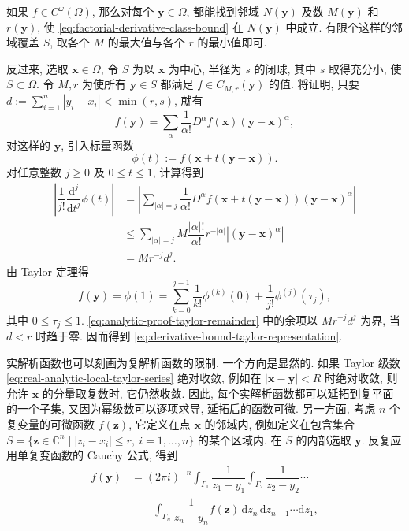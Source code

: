 \begin{Proof}
如果 $f\in C^\omega(\Omega)$, 那么对每个 $\bm{y}\in\Omega$, 都能找到邻域 $N(\bm{y})$ 及数 $M(\bm{y})$ 和 $r(\bm{y})$, 使 \eqref{eq:factorial-derivative-class-bound} 在 $N(\bm{y})$ 中成立. 有限个这样的邻域覆盖 $S$, 取各个 $M$ 的最大值与各个 $r$ 的最小值即可.

反过来, 选取 $\bm{x}\in\Omega$, 令 $S$ 为以 $\bm{x}$ 为中心, 半径为 $s$ 的闭球, 其中 $s$ 取得充分小, 使 $S\subset\Omega$. 令 $M,r$ 为使所有 $\bm{y}\in S$ 都满足 $f\in C_{M,r}(\bm{y})$ 的值. 将证明, 只要 $d:=\sum_{i=1}^n|y_i-x_i|<\min(r,s)$, 就有
\begin{equation}\label{eq:derivative-bound-taylor-representation}
f(\bm{y})=\sum_\alpha\dfrac1{\alpha!}D^\alpha f(\bm{x})(\bm{y}-\bm{x})^\alpha,
\end{equation}
对这样的 $\bm{y}$, 引入标量函数
\begin{equation}\label{eq:analytic-proof-line-segment-function}
\phi(t):=f(\bm{x}+t(\bm{y}-\bm{x})).
\end{equation}
对任意整数 $j\geq0$ 及 $0\leq t\leq1$, 计算得到
\[
\begin{aligned}
\left|\dfrac1{j!}\dfrac{\mathrm{d}^j}{\mathrm{d}t^j}\phi(t)\right|
&=\left|\sum_{|\alpha|=j}\dfrac1{\alpha!}D^\alpha f(\bm{x}+t(\bm{y}-\bm{x}))(\bm{y}-\bm{x})^\alpha\right|\\
&\leq\sum_{|\alpha|=j}M\dfrac{|\alpha|!}{\alpha!}r^{-|\alpha|}|(\bm{y}-\bm{x})^\alpha|\\
&=Mr^{-j}d^j.
\end{aligned}
\]
由 Taylor 定理得
\begin{equation}\label{eq:analytic-proof-taylor-remainder}
f(\bm{y})=\phi(1)=\sum_{k=0}^{j-1}\dfrac1{k!}\phi^{(k)}(0)+\dfrac1{j!}\phi^{(j)}(\tau_j),
\end{equation}
其中 $0\leq\tau_j\leq1$. \eqref{eq:analytic-proof-taylor-remainder} 中的余项以 $Mr^{-j}d^j$ 为界, 当 $d<r$ 时趋于零. 因而得到 \eqref{eq:derivative-bound-taylor-representation}.
\end{Proof}

实解析函数也可以刻画为复解析函数的限制. 一个方向是显然的. 如果 Taylor 级数 \eqref{eq:real-analytic-local-taylor-series} 绝对收敛, 例如在 $|\bm{x}-\bm{y}|<R$ 时绝对收敛, 则允许 $\bm{x}$ 的分量取复数时, 它仍然收敛. 因此, 每个实解析函数都可以延拓到复平面的一个子集, 又因为幂级数可以逐项求导, 延拓后的函数可微. 另一方面, 考虑 $n$ 个复变量的可微函数 $f(\bm{z})$, 它定义在点 $\bm{x}$ 的邻域内, 例如定义在包含集合 $S=\{\bm{z}\in\mathbb{C}^n\mid |z_i-x_i|\leq r,\ i=1,\ldots,n\}$ 的某个区域内. 在 $S$ 的内部选取 $\bm{y}$. 反复应用单复变函数的 Cauchy 公式, 得到
\begin{equation}\label{eq:multivariable-cauchy-formula}
\begin{aligned}
f(\bm{y})&=(2\pi i)^{-n}\int_{\Gamma_1}\dfrac1{z_1-y_1}\int_{\Gamma_2}\dfrac1{z_2-y_2}\cdots\\
&\qquad\int_{\Gamma_n}\dfrac1{z_n-y_n}f(\bm{z})\,\mathrm{d}z_n\,\mathrm{d}z_{n-1}\cdots\mathrm{d}z_1,
\end{aligned}
\end{equation}


